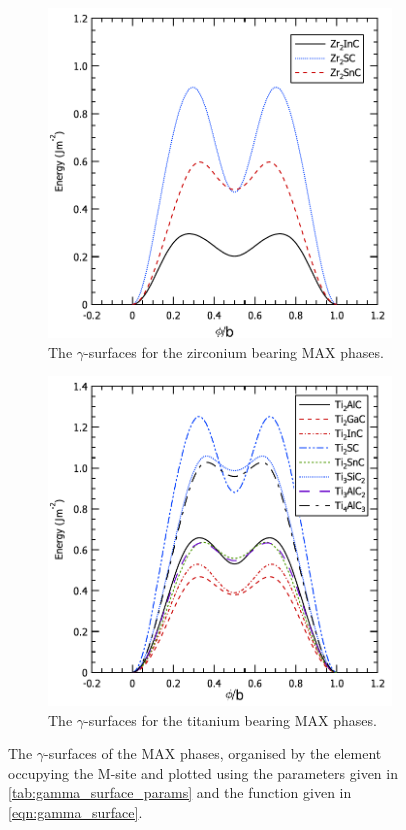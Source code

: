 \begin{figure}
\begin{subfigure}{5cm}
\includegraphics[width=\textwidth]{Zr_gamma_surfaces}
\caption{The $\gamma$-surfaces for the zirconium bearing MAX phases.\label{fig:Zr_gamma_surfaces}}
\end{subfigure}

\begin{subfigure}{5cm}
\centering
\includegraphics[width=\textwidth]{Ti_gamma_surfaces}
\caption{The $\gamma$-surfaces for the titanium bearing MAX phases.\label{fig:Ti_gamma_surfaces}}
\end{subfigure}

\captionsetup{width=12cm}
\caption[The \texorpdfstring{$\gamma$}{gamma}-surfaces of the MAX phases.]{The $\gamma$-surfaces of the MAX phases, organised by the element occupying the M-site and plotted using the parameters given in \autoref{tab:gamma_surface_params} and the function given in \autoref{eqn:gamma_surface}. \label{fig:gamma_surfaces}}
\end{figure}



